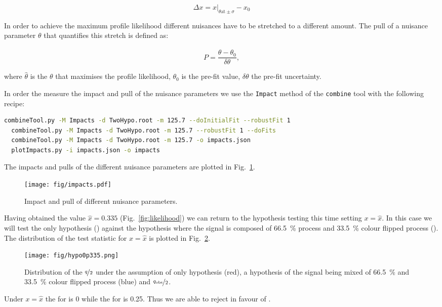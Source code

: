 \begin{equation}
  \Delta x=x\bigg\rvert_{\theta\text{at}\pm\sigma}-x_{0}
\end{equation} 

In order to achieve the maximum profile likelihood different nuisances have to be stretched to a different amount. The pull of a nuisance parameter $\theta$ that quantifies this stretch is defined as:

\begin{equation}
  P=\frac{\hat{\theta}-\theta_{0}}{\delta\theta},
\end{equation} 

\noindent where $\hat{\theta}$ is the $\theta$ that maximises the profile likelihood, $\theta_{0}$ is the pre-fit value, $\delta\theta$ \textendash the pre-fit uncertainty.

In order the measure the impact and pull of the nuisance parameters we use the \lstinline[language=sh]|Impact| method of the \lstinline[language=sh]|combine| tool with the following recipe:

\begin{lstlisting}[language=sh, breaklines=true]
  combineTool.py -M Impacts -d TwoHypo.root -m 125.7 --doInitialFit --robustFit 1
  combineTool.py -M Impacts -d TwoHypo.root -m 125.7 --robustFit 1 --doFits
  combineTool.py -M Impacts -d TwoHypo.root -m 125.7 -o impacts.json
  plotImpacts.py -i impacts.json -o impacts
\end{lstlisting}

The impacts and pulls of the different nuisance parameters are plotted in Fig.~\ref{fig:impacts}.

\begin{figure}
  \centering
  \texttt{[image: fig/impacts.pdf]}
  \caption{Impact and pull of different nuisance parameters.}
  \label{fig:impacts}
\end{figure}

Having obtained the value $\hat{x}=0.335$ (Fig.~\ref{fig:likelihood}) we can return to the hypothesis testing this time setting $x=\hat{x}$. In this case we will test the \ttbar only hypothesis (\Hnull) against the hypothesis where the signal is composed of 66.5~\% \ttbar process and 33.5~\% colour flipped \ttbar process (\Halt). The distribution of the test statistic for $x=\hat{x}$ is plotted in Fig.~\ref{fig:hypo0p335}.

\begin{figure}
  \centering
  \texttt{[image: fig/hypo0p335.png]}
  \caption{Distribution of the $\nicefrac{q}{2}$ under the assumption of \ttbar only hypothesis (red), a hypothesis of the signal being mixed of 66.5~\% \ttbar and 33.5~\% colour flipped \ttbar process (blue) and $\nicefrac{q_{\text{obs}}}{2}$.}
  \label{fig:hypo0p335}
\end{figure}

Under $x=\hat{x}$ the \pval for \Hnull is 0 while the \pval for \Halt is 0.25. Thus we are able to reject \Hnull in favour of \Halt.
